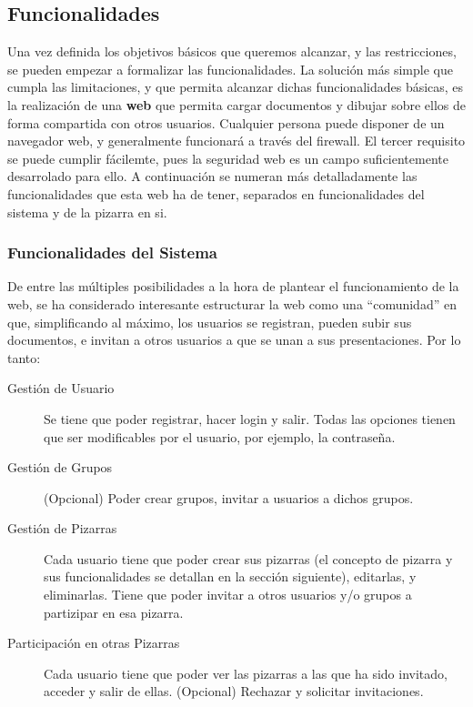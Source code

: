 \subsection{Funcionalidades}
Una vez definida los objetivos básicos que queremos alcanzar, y las restricciones, se pueden empezar a formalizar las funcionalidades. La solución más simple que cumpla las limitaciones, y que permita alcanzar dichas funcionalidades básicas, es la realización de una \textbf{web} que permita cargar documentos y dibujar sobre ellos de forma compartida con otros usuarios. Cualquier persona puede disponer de un navegador web, y generalmente funcionará a través del firewall. El tercer requisito se puede cumplir fácilemte, pues la seguridad web es un campo suficientemente desarrolado para ello. A continuación se numeran más detalladamente las funcionalidades que esta web ha de tener, separados en funcionalidades del sistema y de la pizarra en si.

\subsubsection{Funcionalidades del Sistema}
De entre las múltiples posibilidades a la hora de plantear el funcionamiento de la web, se ha considerado interesante estructurar la web como una ``comunidad'' en que, simplificando al máximo, los usuarios se registran, pueden subir sus documentos, e invitan a otros usuarios a que se unan a sus presentaciones. Por lo tanto:

\begin{description}
	\item[Gestión de Usuario] Se tiene que poder registrar, hacer login y salir. Todas las opciones tienen que ser modificables por el usuario, por ejemplo, la contraseña.
	\item[Gestión de Grupos] (Opcional) Poder crear grupos, invitar a usuarios a dichos grupos.
	\item[Gestión de Pizarras] Cada usuario tiene que poder crear sus pizarras (el concepto de pizarra y sus funcionalidades se detallan en la sección siguiente), editarlas, y eliminarlas. Tiene que poder invitar a otros usuarios y/o grupos a partizipar en esa pizarra.
	\item[Participación en otras Pizarras] Cada usuario tiene que poder ver las pizarras a las que ha sido invitado, acceder y salir de ellas. (Opcional) Rechazar y solicitar invitaciones.
\end{description}

